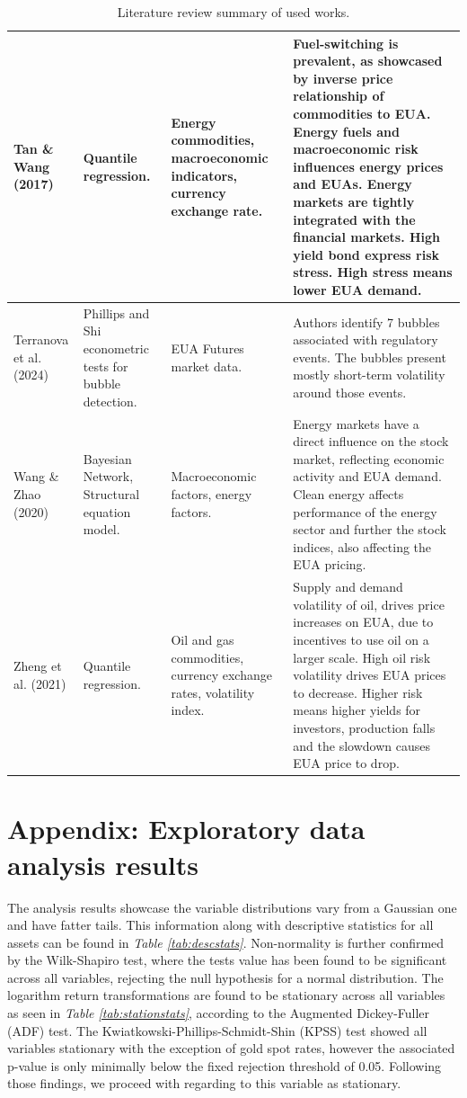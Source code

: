 \documentclass[12pt, letterpaper]{article}
\begin{document}
\begin{table}[H]
{{\begin{tabular}{|p{3cm}|p{3cm}|p{3cm}|p{6cm}|}
\hline
Tan \& Wang (2017) & Quantile regression. & Energy commodities, macroeconomic indicators, currency exchange rate. & Fuel-switching is prevalent, as showcased by inverse price relationship of commodities to EUA. Energy fuels and macroeconomic risk influences energy prices and EUAs. Energy markets are tightly integrated with the financial markets. High yield bond express risk stress. High stress means lower EUA demand. \\
\hline
Terranova et al. (2024) & Phillips and Shi econometric tests for bubble detection. & EUA Futures market data. & Authors identify 7 bubbles associated with regulatory events. The bubbles present mostly short-term volatility around those events. \\
\hline
Wang \& Zhao (2020) & Bayesian Network, Structural equation model. & Macroeconomic factors, energy factors. & Energy markets have a direct influence on the stock market, reflecting economic activity and EUA demand. Clean energy affects performance of the energy sector and further the stock indices, also affecting the EUA pricing. \\
\hline
Zheng et al. (2021) & Quantile regression. & Oil and gas commodities, currency exchange rates, volatility index. & Supply and demand volatility of oil, drives price increases on EUA, due to incentives to use oil on a larger scale. High oil risk volatility drives EUA prices to decrease. Higher risk means higher yields for investors, production falls and the slowdown causes EUA price to drop. \\
\hline
\end{tabular}
}
}
\caption{Literature review summary of used works.}
\label{tab:litrevworks}
\end{table}

\section{Appendix: Exploratory data analysis results}
\label{appendix:eda}

The analysis results showcase the variable distributions vary from a Gaussian one and have fatter tails. This information along with descriptive statistics for all assets can be found in \textit{Table \ref{tab:descstats}}. Non-normality is further confirmed by the Wilk-Shapiro test, where the tests value has been found to be significant across all variables, rejecting the null hypothesis for a normal distribution. The logarithm return transformations are found to be stationary across all variables as seen in \textit{Table \ref{tab:stationstats}}, according to the Augmented Dickey-Fuller (ADF) test. The Kwiatkowski-Phillips-Schmidt-Shin (KPSS) test showed all variables stationary with the exception of gold spot rates, however the associated p-value is only minimally below the fixed rejection threshold of 0.05. Following those findings, we proceed with regarding to this variable as stationary.
\end{document}
